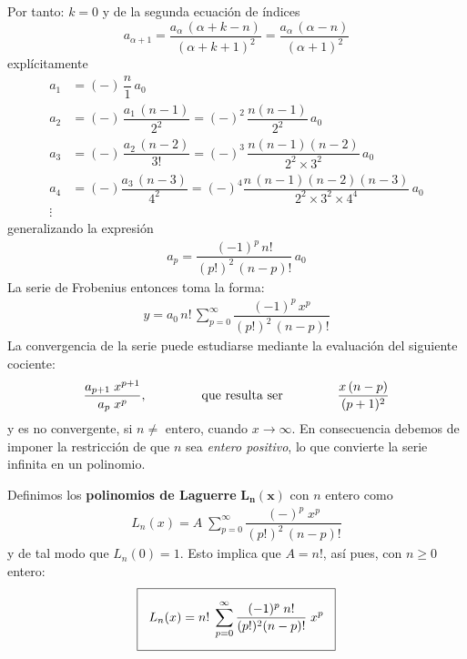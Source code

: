 Por tanto: $k = 0$ y de la segunda ecuación de índices
\[ a_{\alpha + 1} = \dfrac{a_{\alpha} \, (\alpha + k - n)}{(\alpha + k + 1)^{2}} = \dfrac{a_{\alpha} \, (\alpha - n)}{(\alpha + 1)^{2}} \]
explícitamente
\begin{align*}
a_{1} &= (-) \, \dfrac{n}{1} \, a_{0} \\
a_{2} &= (-) \, \dfrac{a_{1} \, (n - 1)}{2^{2}} = (-)^{2} \, \dfrac{n (n - 1)}{2^{2}} \, a_{0} \\
a_{3} &= (-) \, \dfrac{a_{2} \, (n - 2)}{3!} = (-)^{3} \, \dfrac{n (n - 1)(n - 2)}{2^{2} \times 3^{2}} \, a_{0} \\
a_{4} &= (-) \dfrac{a_{3} \, (n - 3)}{4^{2}} = (-)^{4} \dfrac{n \, (n - 1)(n - 2)(n - 3)}{2^{2} \times 3^{2} \times 4^{4}} \, a_{0} \\
\vdots
\end{align*}
generalizando la expresión
\begin{align*}
a_{p} = \dfrac{(-1)^{p} \, n!}{(p!)^{2} \, (n - p)!} \, a_{0}
\end{align*}
La serie de Frobenius entonces toma la forma:
\begin{align*}
y = a_{0} \, n! \, \sum_{p=0}^{\infty} \dfrac{(-1)^{p} \, x^{p}}{(p!)^{2} \, (n - p)! }
\end{align*}
La convergencia de la serie puede estudiarse mediante la evaluación del siguiente cociente:
\begin{align*}
\dfrac{a_{p + 1} \; x^{p + 1}}{a_{p} \; x^{p}}, \hspace{1.5cm} \text{que resulta ser} \hspace{1.5cm} \dfrac{x \, (n - p)}{(p + 1)^{2}}
\end{align*}
y es no convergente, si $n \neq \text{ entero}$, cuando $x \to \infty$. En consecuencia debemos de imponer la restricción de que $n$ sea \emph{entero positivo}, lo que convierte la serie infinita en un polinomio.
\par
Definimos los \textbf{polinomios de Laguerre} $\mathbf{L_{n}(x)}$ con $n$ entero como
\begin{align*}
L_{n}(x) = A \; \sum_{p = 0}^{\infty} \dfrac{(-)^{p} \; x^{p}}{(p!)^{2} \, (n - p)!}
\end{align*}
y de tal modo que $L_{n}(0) = 1$. Esto implica que $A = n!$, así pues, con $n \geq 0$ entero:
\begin{equation}
\setlength{\fboxsep}{3\fboxsep}\boxed{ L_{n}(x) = n! \; \sum_{p = 0}^{\infty} \dfrac{(-1)^{p} \; n!}{(p!)^{2} (n - p)!} \; x^{p}}
\label{eq:ecuacion_08_76}
\end{equation}
